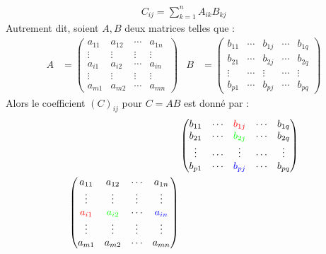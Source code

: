 \begin{definition}
\begin{enumerate}
\begin{align*}
			C_{ij} = \sum_{k=1}^{n} A_{ik} B_{kj}
		\end{align*}
        Autrement dit, soient $A, B$ deux matrices telles que :
        \begin{align*}
            A &= 
            \begin{pmatrix}
                a_{11} & a_{12} & \cdots & a_{1n} \\ 
                \vdots & \vdots & \vdots & \vdots \\
                a_{i1} & a_{i2} & \cdots & a_{in} \\ 
                \vdots & \vdots & \vdots & \vdots \\
                a_{m1} & a_{m2} & \cdots & a_{mn}
            \end{pmatrix}
            &
            B &= 
            \begin{pmatrix}
                b_{11} & \cdots & b_{1j} & \cdots & b_{1q} \\
                b_{21} & \cdots & b_{2j} & \cdots & b_{2q} \\
                \vdots & \cdots & \vdots & \cdots & \vdots \\
                b_{p1} & \cdots & b_{pj} & \cdots & b_{pq}
            \end{pmatrix}
        \end{align*}
        Alors le coefficient $(C)_{ij}$ pour $C = AB$ est donné par :
        \begin{align*}
            &\begin{pmatrix}
                b_{11} & \cdots & \color{red}b_{1j} & \cdots & b_{1q} \\
                b_{21} & \cdots & \color{green}b_{2j} & \cdots & b_{2q} \\
                \vdots & \cdots & \vdots & \cdots & \vdots \\
                b_{p1} & \cdots & \color{blue}b_{pj} & \cdots & b_{pq}
            \end{pmatrix}
            \\
            \begin{pmatrix}
                a_{11} & a_{12} & \cdots & a_{1n} \\ 
                \vdots & \vdots & \vdots & \vdots \\
                \color{red}a_{i1} & \color{green}a_{i2} & \cdots & \color{blue}a_{in} \\ 
                \vdots & \vdots & \vdots & \vdots \\
                a_{m1} & a_{m2} & \cdots & a_{mn}

\end{pmatrix}
\end{align*}
\end{enumerate}
\end{definition}
